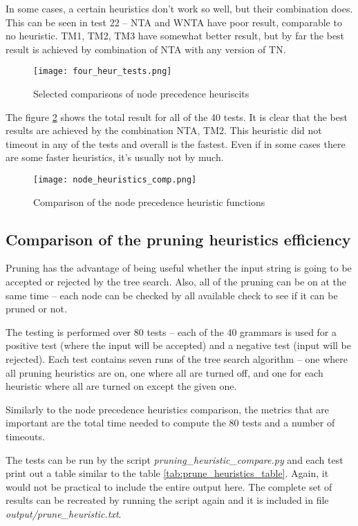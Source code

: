 In some cases, a certain heuristics don't work so well, but their combination does. This can be seen in test 22 -- NTA and WNTA have poor result, comparable to no heuristic. TM1, TM2, TM3 have somewhat better result, but by far the best result is achieved by combination of NTA with any version of TN.

\begin{figure}[h]
  \texttt{[image: four\_heur\_tests.png]}
  \caption{Selected comparisons of node precedence heuriscits}
  \label{fig:selected_tests}
\end{figure}

The figure \ref{fig:node_heuristics_comp} shows the total result for all of the 40 tests. It is clear that the best results are achieved by the combination NTA, TM2. This heuristic did not timeout in any of the tests and overall is the fastest. Even if in some cases there are some faster heuristics, it's usually not by much.

\begin{figure}[h]
  \texttt{[image: node\_heuristics\_comp.png]}
  \caption{Comparison of the node precedence heuristic functions}
  \label{fig:node_heuristics_comp}
\end{figure}

\subsection{Comparison of the pruning heuristics efficiency}

Pruning has the advantage of being useful whether the input string is going to be accepted or rejected by the tree search. Also, all of the pruning can be on at the same time -- each node can be checked by all available check to see if it can be pruned or not.

The testing is performed over 80 tests -- each of the 40 grammars is used for a positive test (where the input will be accepted) and a negative test (input will be rejected).
Each test contains seven runs of the tree search algorithm -- one where all pruning heuristics are on, one where all are turned off, and one for each heuristic where all are turned on except the given one.

Similarly to the node precedence heuristics comparison, the metrics that are important are the total time needed to compute the 80 tests and a number of timeouts.

The tests can be run by the script \textit{pruning\_heuristic\_compare.py} and each test print out a table similar to the table \ref{tab:prune_heuristics_table}. Again, it would not be practical to include the entire output here. The complete set of results can be recreated by running the script again and it is included in file \textit{output/prune\_heuristic.txt}.


